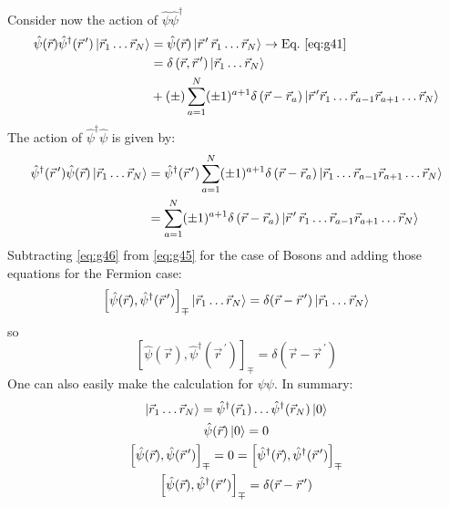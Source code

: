 \documentclass[12pt]{article}
\newcommand{\be}{\begin{equation}}
\newcommand{\ee}{\end{equation}}
\begin{document}
Consider now the action of $\hat{\psi} \hat{\psi}^{\dagger}$
\be
\begin{aligned} 
\hat{\psi}(\vec{r}) \hat{\psi}^{\dagger}(\vec{r}^{\,\prime})
\left|\vec{r}_{1} \ldots \vec{r}_{N}\right\rangle 
&=\hat{\psi}(\vec{r})\left|\vec{r}^{\,\prime}\,\vec{r}_{1} \ldots \vec{r}_{N}\right\rangle 
\to\text{Eq.~\eqref{eq:g41}}\\ 
&=\delta\left(\vec{r}, \vec{r}^{\,\prime}\right)\left|\vec{r}_{1} \ldots \vec{r}_{N}\right\rangle \\ 
&+(\pm) \sum_{a=1}^{N}(\pm1)^{a+1} \delta\left(\vec{r}-\vec{r}_{a}\right)
\ket{\vec{r}^{\,\prime}\vec{r}_1\ldots\vec{r}_{a-1}\vec{r}_{a+1}\ldots\vec{r}_N}
\end{aligned}
\label{eq:g45}
\ee
The action of $\hat{\psi}^{\dagger} \hat{\psi}$  is given by:
\be
\begin{aligned} 
\hat{\psi}^{\dagger}(\vec{r}^{\,\prime}) \hat{\psi}(\vec{r}) 
\left|\vec{r}_{1} \ldots \vec{r}_{N}\right\rangle 
&=\hat{\psi}^{\dagger}(\vec{r}^{\,\prime}) 
   \sum_{a=1}^{N}(\pm1)^{a+1} \delta\left(\vec{r}-\vec{r}_{a}\right)
\ket{\vec{r}_1\ldots\vec{r}_{a-1}\vec{r}_{a+1}\ldots\vec{r}_N}\\
&= \sum_{a=1}^{N}(\pm1)^{a+1} \delta\left(\vec{r}-\vec{r}_{a}\right)
\ket{\vec{r}^{\,\prime}\,\vec{r}_1\ldots\vec{r}_{a-1}\vec{r}_{a+1}\ldots\vec{r}_N}
\end{aligned}
\label{eq:g46}
\ee
Subtracting \eqref{eq:g46} from \eqref{eq:g45} for the case of Bosons and
adding those equations for the Fermion case:
\setcounter{equation}{47}
\be
\left[
\hat{\psi}(\vec{r}),\hat{\psi}^{\dagger}(\vec{r}^{\,\prime})
\right]_\mp
\ket{\vec{r}_1\ldots\vec{r}_N} = \delta(\vec{r} - \vec{r}^{\,\prime}) 
\ket{\vec{r}_1\ldots\vec{r}_N}
\ee
so
\be
\left[
\hat{\psi}(\vec{r}),\hat{\psi}^{\dagger}(\vec{r}^{\,\prime})
\right]_\mp = \delta(\vec{r} - \vec{r}^{\,\prime})
\ee
One can also easily make the calculation for $\psi\psi$. In summary:
\begin{gather}
\ket{\vec{r}_1\ldots\vec{r}_N} = \hat{\psi}^{\dagger}(\vec{r}_1)\ldots\hat{\psi}^{\dagger}(\vec{r}_N) \ket{0}\label{eq:g50}\\
\hat{\psi}(\vec{r})\ket{0} = 0\label{eq:g51}\\
\left[
\hat{\psi}(\vec{r}),\hat{\psi}(\vec{r}^{\,\prime})
\right]_\mp 
= 0 = 
\left[
\hat{\psi}^{\dagger}(\vec{r}),\hat{\psi}^{\dagger}(\vec{r}^{\,\prime})
\right]_\mp\label{eq:g52}\\
\left[
\hat{\psi}(\vec{r}),\hat{\psi}^{\dagger}(\vec{r}^{\,\prime})
\right]_\mp = \delta(\vec{r} - \vec{r}^{\,\prime})\label{eq:g53}
\end{gather}
\end{document}
